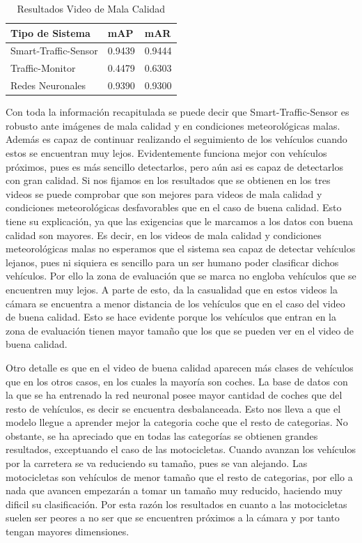 \begin{table}[htbp][H] 
\begin{center}
\begin{tabular}{|l|l|l|}
\hline
Tipo de Sistema & mAP & mAR  \\ 
\hline \hline
Smart-Traffic-Sensor & 0.9439 & 0.9444 \\ \hline
Traffic-Monitor & 0.4479 & 0.6303 \\ \hline
Redes Neuronales & 0.9390 & 0.9300\\ \hline
\end{tabular}
\caption{Resultados Video de Mala Calidad}
\label{resultados_video_mala_calidad}
\end{center}
\end{table}

Con toda la información recapitulada se puede decir que Smart-Traffic-Sensor es robusto ante imágenes de mala calidad y en condiciones meteorológicas malas. Además es capaz de continuar realizando el seguimiento de los vehículos cuando estos se encuentran muy lejos.
Evidentemente funciona mejor con vehículos próximos, pues es más sencillo detectarlos, pero aún asi es  capaz de detectarlos con gran calidad. Si nos fijamos en los resultados que se obtienen en los tres videos se puede comprobar que son mejores para videos de mala calidad y condiciones meteorológicas desfavorables que en el caso de buena calidad. Esto tiene su explicación, ya que las exigencias que le marcamos a los datos con buena calidad son mayores. Es decir, en los videos de mala calidad y condiciones meteorológicas malas  no esperamos que el sistema sea capaz de detectar vehículos lejanos, pues ni siquiera es sencillo para un ser humano poder clasificar dichos vehículos. Por ello la zona de evaluación que se marca no engloba vehículos que se encuentren muy lejos. A parte de esto, da la casualidad que en estos videos la cámara se encuentra a menor distancia de los vehículos que en el caso del video de buena calidad. Esto se hace evidente porque los vehículos que entran en la zona de evaluación tienen mayor tamaño que los que se pueden ver en el video de buena calidad.

Otro detalle es que en el video de buena calidad aparecen más clases de vehículos que en los otros casos, en los cuales la mayoría son coches. La base de datos con la que se ha entrenado la red neuronal posee mayor cantidad de coches que del resto de vehículos, es decir se encuentra desbalanceada. Esto nos lleva a que el modelo llegue a aprender mejor la categoria coche que el resto de categorias. No obstante, se ha apreciado que en todas las categorías se obtienen grandes resultados, exceptuando el caso de las motocicletas. Cuando avanzan los vehículos por la carretera se va reduciendo su tamaño, pues se van alejando. Las motocicletas son vehículos de menor tamaño que el resto de categorias, por ello a nada que avancen empezarán a tomar un tamaño muy reducido, haciendo muy dificil su clasificación. Por esta razón los resultados en cuanto a las motocicletas suelen ser peores a no ser que se encuentren próximos a la cámara y por tanto tengan mayores dimensiones.

